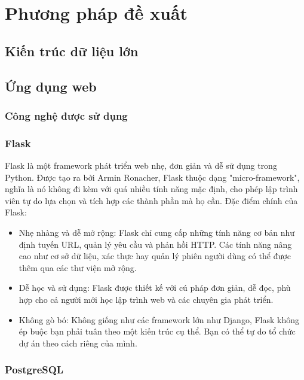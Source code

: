 \section{Phương pháp đề xuất}
\subsection{Kiến trúc dữ liệu lớn}
\subsection{Ứng dụng web}
\subsubsection{Công nghệ được sử dụng }
\subsubsection{Flask}

Flask là một framework phát triển web nhẹ, đơn giản và dễ sử dụng trong Python.
Được tạo ra bởi Armin Ronacher, Flask thuộc dạng "micro-framework", nghĩa là nó
không đi kèm với quá nhiều tính năng mặc định, cho phép lập trình viên tự do lựa
chọn và tích hợp các thành phần mà họ cần. Đặc điểm chính của Flask:
\begin{itemize}
    \item Nhẹ nhàng và dễ mở rộng: Flask chỉ cung cấp những tính năng cơ bản như
        định tuyến URL, quản lý yêu cầu và phản hồi HTTP. Các tính năng nâng cao như cơ sở dữ liệu, xác thực hay quản lý phiên người dùng có thể được thêm qua các thư viện mở rộng.
    \item Dễ học và sử dụng: Flask được thiết kế với cú pháp đơn giản, dễ đọc,
        phù hợp cho cả người mới học lập trình web và các chuyên gia phát triển.
    \item Không gò bó: Không giống như các framework lớn như Django, Flask không
        ép buộc bạn phải tuân theo một kiến trúc cụ thể. Bạn có thể tự do tổ chức dự án theo cách riêng của mình.
\end{itemize}

\subsubsection{PostgreSQL}

